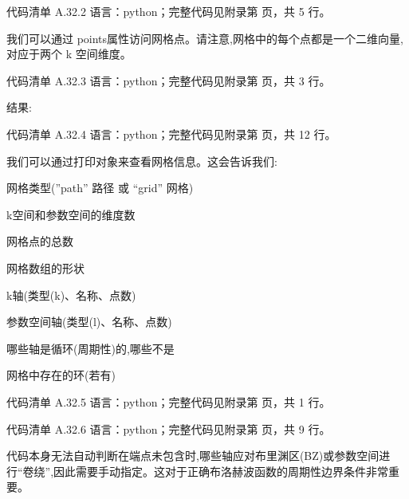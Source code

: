\documentclass[lang=cn,scheme=chinese,color=blue,device=normal,toc=onecol,math=cm]{elegantbook}
\begin{document}
\begin{codeindexbox}{代码清单 A.32.2}
语言：python；完整代码见附录第 \pageref{code:32:2} 页，共 5 行。
\end{codeindexbox}


我们可以通过 points属性访问网格点。请注意,网格中的每个点都是一个二维向量,对应于两个 k 空间维度。\par


\begin{codeindexbox}{代码清单 A.32.3}
语言：python；完整代码见附录第 \pageref{code:32:3} 页，共 3 行。
\end{codeindexbox}


结果:\par


\begin{codeindexbox}{代码清单 A.32.4}
语言：python；完整代码见附录第 \pageref{code:32:4} 页，共 12 行。
\end{codeindexbox}


我们可以通过打印对象来查看网格信息。这会告诉我们:\par


网格类型(”path” 路径 或 “grid” 网格)\par


k空间和参数空间的维度数\par


网格点的总数\par


网格数组的形状\par


k轴(类型(k)、名称、点数)\par


参数空间轴(类型(l)、名称、点数)\par


哪些轴是循环(周期性)的,哪些不是\par


网格中存在的环(若有)\par


\begin{codeindexbox}{代码清单 A.32.5}
语言：python；完整代码见附录第 \pageref{code:32:5} 页，共 1 行。
\end{codeindexbox}


\begin{codeindexbox}{代码清单 A.32.6}
语言：python；完整代码见附录第 \pageref{code:32:6} 页，共 9 行。
\end{codeindexbox}


代码本身无法自动判断在端点未包含时,哪些轴应对布里渊区(BZ)或参数空间进行“卷绕”,因此需要手动指定。这对于正确布洛赫波函数的周期性边界条件非常重要。\par
\end{document}
